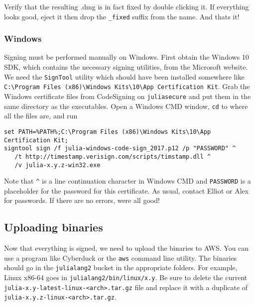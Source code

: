 Verify that the resulting .dmg is in fact fixed by double clicking it. If everything looks good, eject it then drop the \texttt{\_fixed} suffix from the name. And that{\textquotesingle}s it!



\hypertarget{4146385850442974710}{}


\subsubsection{Windows}



Signing must be performed manually on Windows. First obtain the Windows 10 SDK, which contains the necessary signing utilities, from the Microsoft website. We need the \texttt{SignTool} utility which should have been installed somewhere like \texttt{C:{\textbackslash}Program Files (x86){\textbackslash}Windows Kits{\textbackslash}10{\textbackslash}App Certification Kit}. Grab the Windows certificate files from CodeSigning on \texttt{juliasecure} and put them in the same directory as the executables. Open a Windows CMD window, \texttt{cd} to where all the files are, and run




\begin{lstlisting}
set PATH=%PATH%;C:\Program Files (x86)\Windows Kits\10\App Certification Kit;
signtool sign /f julia-windows-code-sign_2017.p12 /p "PASSWORD" ^
   /t http://timestamp.verisign.com/scripts/timstamp.dll ^
   /v julia-x.y.z-win32.exe
\end{lstlisting}



Note that \texttt{{\textasciicircum}} is a line continuation character in Windows CMD and \texttt{PASSWORD} is a placeholder for the password for this certificate. As usual, contact Elliot or Alex for passwords. If there are no errors, we{\textquotesingle}re all good!



\hypertarget{13693621271485293889}{}


\subsection{Uploading binaries}



Now that everything is signed, we need to upload the binaries to AWS. You can use a program like Cyberduck or the \texttt{aws} command line utility. The binaries should go in the \texttt{julialang2} bucket in the appropriate folders. For example, Linux x86-64 goes in \texttt{julialang2/bin/linux/x.y}. Be sure to delete the current \texttt{julia-x.y-latest-linux-<arch>.tar.gz} file and replace it with a duplicate of \texttt{julia-x.y.z-linux-<arch>.tar.gz}.



